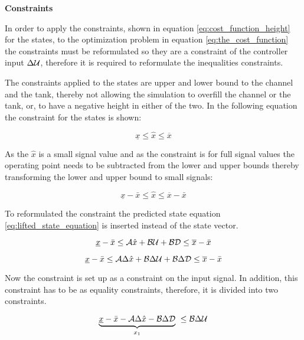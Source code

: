 \textbf{Constraints}

In order to apply the constraints, shown in equation \ref{eq:cost_function_height} for the states, to the optimization problem in equation \ref{eq:the_cost_function} the constraints must be reformulated so they are a constraint of the controller input $\Delta\CMcal{U}$, therefore it is required to reformulate the inequalities constraints. 

The constraints applied to the states are upper and lower bound to the channel and the tank, thereby not allowing the simulation to overfill the channel or the tank, or, to have a negative height in either of the two. In the following equation the constraint for the states is shown:  


\begin{equation}
    \underline{x} \leq \hat{x} \leq \overline{x}
\end{equation}

As the $\hat{x}$ is a small signal value and as the constraint is for full signal values the operating point needs to be subtracted from the lower and upper bounds thereby transforming the lower and upper bound to small signals:

\begin{equation}
    \underline{x}- \bar{x} \leq \hat{x} \leq \overline{x}-\bar{x}
\end{equation}

To reformulated the constraint the predicted state equation \ref{eq:lifted_state_equation} is inserted instead of the state vector.

\begin{equation}
     \underline{x}- \bar{x} \leq \CMcal{A}\hat{x}+\CMcal{B}\CMcal{U}+\CMcal{BD} \leq \overline{x}-\bar{x}
 \end{equation} 



\begin{equation}
     \underline{x}- \bar{x} \leq \CMcal{A}\Delta\hat{x}+\CMcal{B}\Delta\CMcal{U}+\CMcal{B}\Delta\CMcal{D} \leq \overline{x}-\bar{x}
 \end{equation} 


 Now the constraint is set up as a constraint on the input signal. In addition, this constraint has to be as equality constraints, therefore, it is divided into two constraints. 

 \begin{equation}
       \underbrace{\underline{x}- \bar{x}-\CMcal{A}\Delta\hat{x}-\CMcal{B}\Delta\CMcal{D}}_{x_1}\  \leq \CMcal{B}\Delta\CMcal{U}
 \end{equation}  

